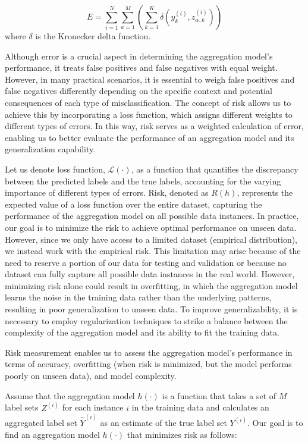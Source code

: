 \begin{equation}
E = \sum_{i=1}^N \sum_{a=1}^M \left( \sum_{k=1}^K \delta\left(y_k^{(i)}, z_{\alpha,k}^{(i)}\right) \right)
\label{eq:crowd.eq.1.risk.error}
\end{equation}
where $\delta $ is the Kronecker delta function.

Although error is a crucial aspect in determining the aggregation model's performance, it treats false positives and false negatives with equal weight. However, in many practical scenarios, it is essential to weigh false positives and false negatives differently depending on the specific context and potential consequences of each type of misclassification. The concept of risk allows us to achieve this by incorporating a loss function, which assigns different weights to different types of errors. In this way, risk serves as a weighted calculation of error, enabling us to better evaluate the performance of an aggregation model and its generalization capability.

Let us denote loss function, $\mathcal{L}(\cdot)$, as a function that quantifies the discrepancy between the predicted labels and the true labels, accounting for the varying importance of different types of errors.
Risk, denoted as $R(h) $, represents the expected value of a loss  function over the entire dataset, capturing the performance of the aggregation model on all possible data instances.  In practice, our goal is to minimize the risk to achieve optimal performance on unseen data. However, since we only have access to a limited dataset (empirical distribution), we instead work with the empirical risk. This limitation may arise because of the need to reserve a portion of our data for testing and validation or because no dataset can fully capture all possible data instances in the real world. However, minimizing risk alone could result in overfitting, in which the aggregation model learns the noise in the training data rather than the underlying patterns, resulting in poor generalization to unseen data. To improve generalizability, it is necessary to employ regularization techniques to strike a balance between the complexity of the aggregation model and its ability to fit the training data.

Risk measurement enables us to assess the aggregation model's performance in terms of accuracy, overfitting (when risk is minimized, but the model performs poorly on unseen data), and model complexity.

Assume that the aggregation model $h (\cdot) $ is a function that takes a set of $M $ label sets $Z^{(i)} $ for each instance $i $ in the training data and calculates an aggregated label set $\widehat{Y}^{(i)} $ as an estimate of the true label set $Y^{(i)} $. Our goal is to find an aggregation model $h(\cdot) $ that minimizes risk as follows:

